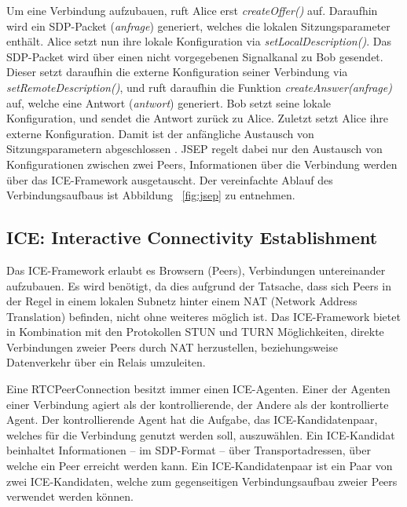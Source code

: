 Um eine Verbindung aufzubauen, ruft Alice erst \textit{createOffer()} auf. Daraufhin wird ein SDP-Packet (\textit{anfrage}) generiert, welches die lokalen Sitzungsparameter enthält. Alice setzt nun ihre lokale Konfiguration via \textit{setLocalDescription()}. Das \acs{SDP}-Packet wird über einen nicht vorgegebenen Signalkanal zu Bob gesendet. Dieser setzt daraufhin die externe Konfiguration seiner Verbindung via \textit{setRemoteDescription()}, und ruft daraufhin die Funktion \textit{createAnswer(anfrage)} auf, welche eine Antwort (\textit{antwort}) generiert. Bob setzt seine lokale Konfiguration, und sendet die Antwort zurück zu Alice. Zuletzt setzt Alice ihre externe Konfiguration. Damit ist der anfängliche Austausch von Sitzungsparametern abgeschlossen \cite{altanai2014}. \acs{JSEP} regelt dabei nur den Austausch von Konfigurationen zwischen zwei Peers, Informationen über die Verbindung werden über das \acs{ICE}-Framework ausgetauscht. Der vereinfachte Ablauf des Verbindungsaufbaus ist Abbildung ~\ref{fig:jsep} zu entnehmen.

\subsection{ICE: Interactive Connectivity Establishment}
Das \acf{ICE}-Framework erlaubt es Browsern (Peers), Verbindungen untereinander aufzubauen. Es wird benötigt, da dies aufgrund der Tatsache, dass sich Peers in der Regel in einem lokalen Subnetz hinter einem \acs{NAT} (Network Address Translation) befinden, nicht ohne weiteres möglich ist. Das \acs{ICE}-Framework bietet in Kombination mit den Protokollen \acs{STUN} und \acs{TURN} Möglichkeiten, direkte Verbindungen zweier Peers durch \acs{NAT} herzustellen, beziehungsweise Datenverkehr über ein Relais umzuleiten.\par

Eine RTCPeerConnection besitzt immer einen \acs{ICE}-Agenten. Einer der Agenten einer Verbindung agiert als der kontrollierende, der Andere als der kontrollierte Agent. Der kontrollierende Agent hat die Aufgabe, das \acs{ICE}-Kandidatenpaar, welches für die Verbindung genutzt werden soll, auszuwählen. Ein \acs{ICE}-Kandidat beinhaltet Informationen -- im \acs{SDP}-Format -- über Transportadressen, über welche ein Peer erreicht werden kann. Ein \acs{ICE}-Kandidatenpaar ist ein Paar von zwei \acs{ICE}-Kandidaten, welche zum gegenseitigen Verbindungsaufbau zweier Peers verwendet werden können.

